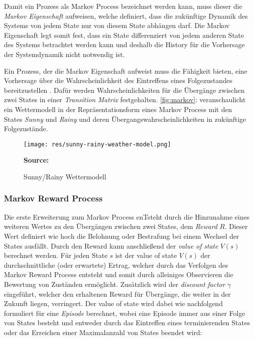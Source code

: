 \documentclass[11pt]{scrartcl}
\newcommand{\source}[1]{\vspace{-5pt} \caption*{\hfill \textbf{Source:} {#1}} }
\begin{document}
Damit ein Prozess als Markov Process bezeichnet werden kann, muss dieser die \textit{Markov Eigenschaft}
aufweisen, welche definiert, dass die zukünftige Dynamik des Systems von jedem State nur
von diesem State abhängen darf. Die Markov Eigenschaft legt somit fest, dass ein State
differenziert von jedem anderen State des Systems betrachtet werden kann und deshalb die
History für die Vorhersage der Systemdynamik nicht notwendig ist.

Ein Prozess, der die Markov Eigenschaft aufweist muss die Fähigkeit bieten, eine Vorhersage über
die Wahrscheinlichkeit des Eintreffens eines Folgezustandes bereitzustellen \cite[~S.12 f.]{L2018}. 
Dafür werden Wahrscheinlichkeiten für die Übergänge zwischen zwei States in einer
\textit{Transition Matrix} festgehalten. \autoref{fig:markov}: 
veranschaulicht ein Wettermodell in der Repräsentationsform eines Markov Process mit den States
\textit{Sunny} und \textit{Rainy} und deren Übergangswahrscheinlichkeiten in zukünftige
Folgezustände.

\begin{figure}[htp]
\centering
\texttt{[image: res/sunny-rainy-weather-model.png]}
\caption{Sunny/Rainy Wettermodell}
\source{\cite[~S.13 - Chapter 1 - Figure 4]{L2018}}
\label{fig:markov}
\end{figure}


\subsubsection{Markov Reward Process}
\label{sec:markov_reward_process}
Die erste Erweiterung zum Markov Process enTsteht durch die Hinzunahme eines weiteren Wertes zu den
Übergängen zwischen zwei States, dem \textit{Reward} $R$. Dieser Wert definiert wie hoch die Belohnung
oder Bestrafung bei einem Wechsel der States ausfällt. Durch den Reward kann anschließend der
\textit{value of state} $V(s)$ berechnet werden. Für jeden State $s$ ist der value of state $V(s)$
der durchschnittliche (oder erwartete) Ertrag, welcher durch das Verfolgen des Markov Reward Process
entsteht und somit durch alleiniges Observieren die Bewertung von Zuständen ermöglicht.
Zusätzlich wird der \textit{discount factor} $\gamma$ eingeführt, welcher den erhaltenen Reward
für Übergänge, die weiter in der Zukunft liegen, verringert. Der value of state wird dabei wie
nachfolgend formuliert für eine \textit{Episode} berechnet, wobei eine Episode immer aus einer
Folge von States besteht und entweder durch das Eintreffen eines terminierenden States oder das
Erreichen einer Maximalanzahl von States beendet wird:
\end{document}
